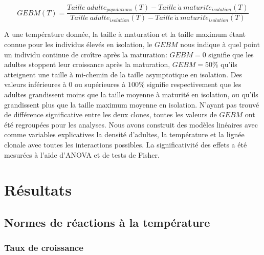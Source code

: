 \begin{equation}
GEBM(T) = \frac{Taille\ adulte_{populations}(T) -
Taille\ \grave{a} \ maturit\acute{e}_{isolation}(T)}{Taille\ adulte_{isolation}(T) -
Taille\ \grave{a} \ maturit\acute{e}_{isolation}(T)}
\end{equation}

A une température donnée, la taille à maturation et la taille maximum étant
connue pour les individus élevés en isolation, le $GEBM$ nous indique à quel
point un individu continue de croître après la maturation: $GEBM=0$ signifie que
les adultes stoppent leur croissance après la maturation, $GEBM=50\%$ qu'ils
atteignent une taille à mi-chemin de la taille asymptotique en isolation. Des
valeurs inférieures à 0 ou supérieures à $100\%$ signifie respectivement que les
adultes grandissent moins que la taille moyenne à maturité en isolation, ou
qu'ils grandissent plus que la taille maximum moyenne en isolation. N'ayant pas
trouvé de différence significative entre les deux clones, toutes les valeurs de
$GEBM$ ont été regroupées pour les analyses. Nous avons construit des modèles
linéaires avec comme variables explicatives la densité d'adultes, la
température et la lignée clonale avec toutes les interactions possibles. La
significativité des effets a été mesurées à l'aide d'ANOVA et de tests de
Fisher.

\section{Résultats}

\subsection{Normes de réactions à la température}

\subsubsection{Taux de croissance}

